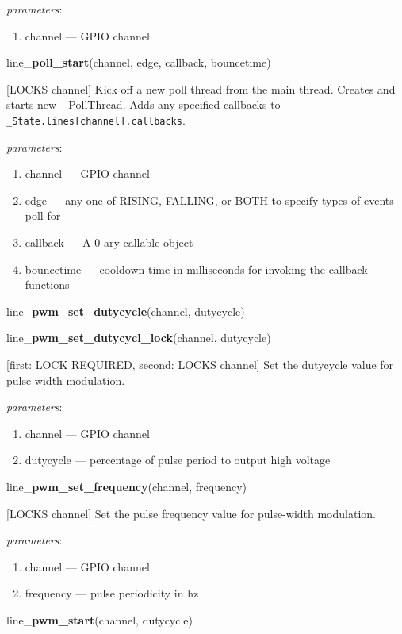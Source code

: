 \documentclass[12pt]{article}
\begin{document}
\textit{parameters}:
\begin{enumerate}      
        \item channel --- GPIO channel
\end{enumerate}

\noindent line\_\textbf{poll\_start}(channel, edge, callback, bouncetime)

[LOCKS channel] Kick off a new poll thread from the main thread.
Creates and starts new \_PollThread. Adds any specified callbacks to \texttt{\_State.lines[channel].callbacks}. 

\textit{parameters}:
\begin{enumerate}      
        \item channel --- GPIO channel
        \item edge --- any one of RISING, FALLING, or BOTH to specify types of events poll for
        \item callback --- A 0-ary callable object
        \item bouncetime --- cooldown time in milliseconds for invoking the callback functions
\end{enumerate}

\noindent line\_\textbf{pwm\_set\_dutycycle}(channel, dutycycle)

\noindent line\_\textbf{pwm\_set\_dutycycl\_lock}(channel, dutycycle)

[first: LOCK REQUIRED, second: LOCKS channel]
Set the dutycycle value for pulse-width modulation.

\textit{parameters}:
\begin{enumerate}      
        \item channel --- GPIO channel
        \item dutycycle --- percentage of pulse period to output high voltage
\end{enumerate}

\noindent line\_\textbf{pwm\_set\_frequency}(channel, frequency)

[LOCKS channel] Set the pulse frequency value for pulse-width modulation.

\textit{parameters}:
\begin{enumerate}      
        \item channel --- GPIO channel
        \item frequency --- pulse periodicity in hz
\end{enumerate}

\noindent line\_\textbf{pwm\_start}(channel, dutycycle)
\end{document}
